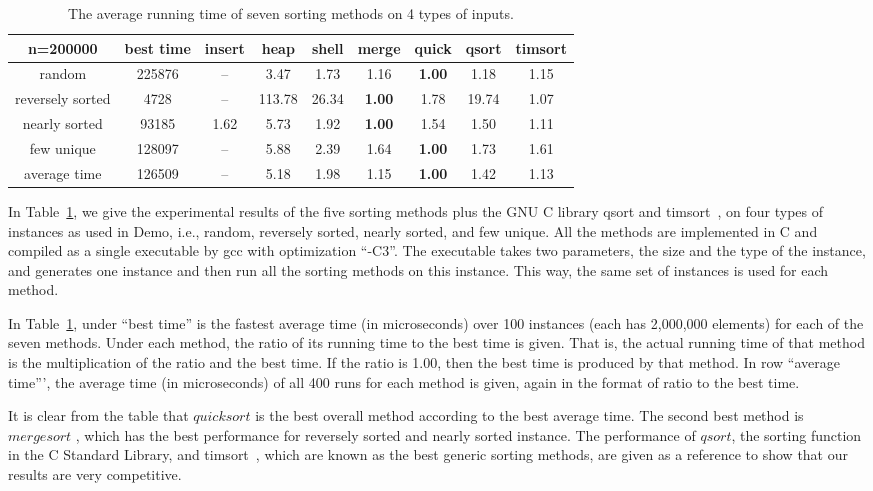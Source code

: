 \documentclass[AMA,STIX1COL]{WileyNJD-v2}
\newcommand{\qusort}{$quicksort$ }
\newcommand{\msort}{$mergesort$ }
\begin{document}
\begin{table}
\caption{The average running time of seven sorting methods on 4 types of inputs.}
\centering
\begin{tabular}{|c|c|c|c|c|c|c|c|c|}
\toprule
n=200000 & best time & insert & heap & shell & merge & quick & qsort & timsort\\
\midrule
random & 225876 & -- & 3.47 & 1.73 & 1.16 & \textbf{1.00} & 1.18 & 1.15 \\
reversely sorted&4728&--&113.78&26.34&\textbf{1.00}&1.78&19.74&1.07\\
nearly sorted & 93185&1.62&5.73&1.92&\textbf{1.00} & 1.54 &1.50 &1.11 \\
few unique & 128097 & --	& 5.88 & 2.39 & 1.64 & \textbf{1.00} & 1.73 & 1.61 \\
average time & 126509 & -- &	5.18& 1.98 & 1.15 & \textbf{1.00} & 1.42 & 1.13 \\
\bottomrule
\end{tabular}
\label{table1}
\end{table}

In Table~\ref{table1}, we give the experimental results of the five sorting methods plus the GNU C library qsort and timsort~\cite{timsort}, on four types of instances as used in Demo, i.e., random, reversely sorted, nearly sorted, and few unique. 
All the methods are implemented in C and compiled as a single executable by gcc with optimization “-C3”. 
The executable takes two parameters, the size and the type of the instance, and generates one instance and then run all the sorting methods on this instance. 
This way, the same set of instances is used for each method.

In Table~\ref{table1}, under “best time” is the fastest average time (in microseconds) over 100 instances (each has 2,000,000 elements) for each of the seven methods.  
Under each method, the ratio of its running time to the best time is given. 
That is, the actual running time of that method is the multiplication of the ratio and the best time. 
If the ratio is 1.00, then the best time is produced by that method. 
In row “average time”', the average time (in microseconds) of all 400 runs for each method is given, again in the format of ratio to the best time.

It is clear from the table that \qusort is the best overall method according to the best average time. 
The second best method is \msort, which has the best performance for reversely sorted and nearly sorted instance. 
The performance of $qsort$, the sorting function in the C Standard Library, and timsort~\cite{timsort}, which are known as the best generic sorting methods, are given as a reference to show that our results are very competitive.  
\end{document}
